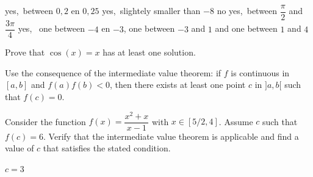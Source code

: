 \begin{Answer}\phantom{}
    
			\Question yes,\ between $0,2$ en $0,25$ 
			\Question yes,\ slightely smaller than $-8$
			\Question no
			\Question yes,\ between $\dfrac{\pi}{2}$ and $\dfrac{3\pi}{4}$
			\Question yes, \ one between $-4$ en $-3$, one between $-3$ and $1$ and one between $1$ and $4$
\end{Answer}

\ifanalysis
\begin{Exercise}[difficulty = 2] Prove that $\cos (x) = x$ has at least one solution.

\end{Exercise}

\begin{Answer}\phantom{}
    Use the consequence of the intermediate value theorem: if $f$ is continuous in $[a,b]$ and $f(a)f(b)<0$, then there exists at least one point $c$ in $]a,b[$ such that $f(c)=0$. 
\end{Answer}

\begin{Exercise}[difficulty = 2] Consider the function $f(x) = \dfrac{x^2 + x}{x-1}$ with $x \in \left[5/2,4 \right]$. Assume $c$ such that $f(c)=6$. Verify that the intermediate value theorem is applicable and find a value of $c$ that satisfies the stated condition.     

\end{Exercise}

\begin{Answer}\phantom{}
    $c=3$
\end{Answer}
\fi

\subsection*{}


